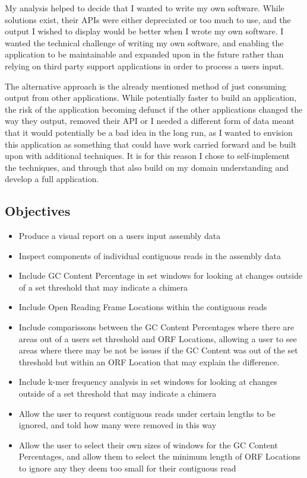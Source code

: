 My analysis helped to decide that I wanted to write my own software. While solutions exist, their APIs were either depreciated or too much to use, and the output I wished to display would be better when I wrote my own software. I wanted the technical challenge of writing my own software, and enabling the application to be maintainable and expanded upon in the future rather than relying on third party support applications in order to process a users input.

The alternative approach is the already mentioned method of just consuming output from other applications. While potentially faster to build an application, the risk of the application becoming defunct if the other applications changed the way they output, removed their API or I needed a different form of data meant that it would potentially be a bad idea in the long run, as I wanted to envision this application as something that could have work carried forward and be built upon with additional techniques. It is for this reason I chose to self-implement the techniques, and through that also build on my domain understanding and develop a full application.

\subsection{Objectives}
\begin{itemize}
\item Produce a visual report on a users input assembly data
\item Inspect components of individual contiguous reads in the assembly data
\item Include GC Content Percentage in set windows for looking at changes outside of a set threshold that may indicate a chimera
\item Include Open Reading Frame Locations within the contiguous reads
\item Include comparissons between the GC Content Percentages where there are areas out of a users set threshold and ORF  Locations, allowing a user to see areas where there may be not be issues if the GC Content was out of the set threshold but within an ORF Location that may explain the difference.
\item Include k-mer frequency analysis  in set windows for looking at changes outside of a set threshold that may indicate a chimera
\item Allow the user to request contiguous reads under certain lengths to be ignored, and told how many were removed in this way
\item Allow the user to select their own sizes of windows for the GC Content Percentages, and allow them to select the minimum length of ORF Locations to ignore any they deem too small for their contiguous read
\end{itemize}

